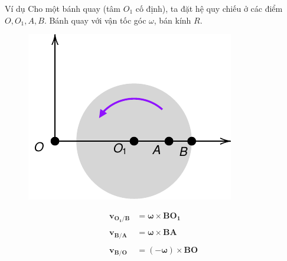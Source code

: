 \begin{frame}{Ví dụ}
    Cho một bánh quay (tâm \(O_1\) cố định), ta đặt hệ quy chiếu ở các điểm \(O,O_1,A,B\). Bánh quay với vận tốc góc \(\omega\), bán kính \(R\).
\begin{center}
    \begin{minipage}{0.5\linewidth}
        \begin{figure}
        \centering
        \includegraphics[width=0.8\linewidth]{Figures/FoR_4.pdf}
        \caption{}
        \label{fig:FoR_4}
        \end{figure}        
    \end{minipage}
    \hspace{1mm}
    \begin{minipage}{0.4\linewidth}
        \begin{equation*}
            \begin{array}{ll}
            \mathbf{v_{O_1/B}} &= \mathbf{\omega} \times \mathbf{BO_1} \\ \\
            \mathbf{v_{B/A}} &= \mathbf{\omega} \times \mathbf{BA} \\ \\
            \mathbf{v_{B/O}} &= \mathbf{(-\omega)} \times \mathbf{BO} 
            \end{array}
        \end{equation*}         
    \end{minipage}
\end{center}
\end{frame}


